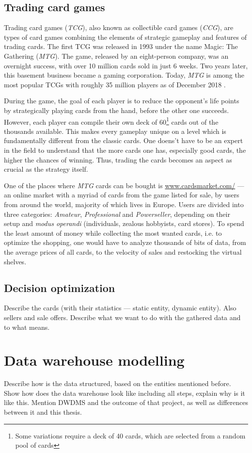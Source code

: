 \subsection{Trading card games}
Trading card games (\textit{TCG}), also known as collectible card games (\textit{CCG}), are types of card games combining the elements of strategic gameplay and features of trading cards.
The first TCG was released in 1993 under the name Magic: The Gathering (\textit{MTG}). The game, released by an eight-person company, was an overnight success, with over 10 million cards sold in just 6 weeks.
Two years later, this basement business became a gaming corporation. Today, \textit{MTG} is among the most popular TCGs with roughly 35 million players as of December 2018 \cite{magicTheGathering}. \par
During the game, the goal of each player is to reduce the opponent's life points by strategically playing cards from the hand, before the other one succeeds. However, each player can compile their own deck of 60\footnote{Some variations require a deck of 40 cards, which are selected from a random pool of cards} cards out of the thousands available. This makes every gameplay unique on a level which is fundamentally different from the classic cards. One doens't have to be an expert in the field to understand that the more cards one has, especially good cards, the higher the chances of winning. Thus, trading the cards becomes an aspect as crucial as the strategy itself. \par
One of the places where \textit{MTG} cards can be bought is \url{www.cardsmarket.com/} --- an online market with a myriad of cards from the game listed for sale, by users from around the world, majority of which lives in Europe. Users are divided into three categories: \textit{Amateur}, \textit{Professional} and \textit{Powerseller}, depending on their setup and \textit{modus operandi} (individuals, zealous hobbyists, card stores). To spend the least amount of money while collecting the most wanted cards, i.e. to optimize the shopping, one would have to analyze thousands of bits of data, from the average prices of all cards, to the velocity of sales and restocking the virtual shelves.

\subsection{Decision optimization}
Describe the cards (with their statistics --- static entity, dynamic entity). Also sellers and sale offers.
Describe what we want to do with the gathered data and to what means.


\section{Data warehouse modelling}
Describe how is the data structured, based on the entities mentioned before. Show how does the data warehouse look like including all steps, explain why is it like this. Mention DWDMS and the outcome of that project, as well as differences between it and this thesis.
